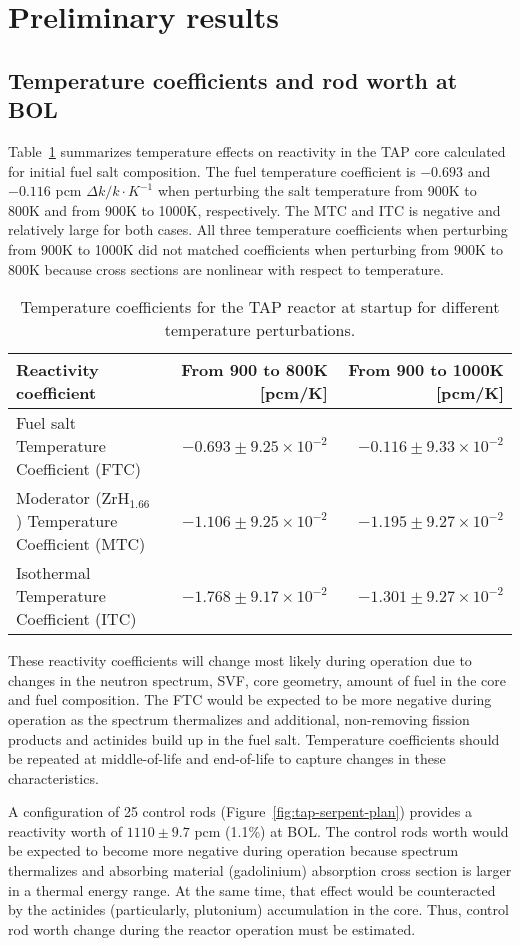 \section{Preliminary results}

\subsection{Temperature coefficients and rod worth at BOL}
Table~\ref{tab:tcoef} summarizes temperature effects on reactivity in the 
\gls{TAP} core calculated for initial fuel salt composition. The fuel 
temperature coefficient is $-0.693$ and $-0.116$ pcm $\Delta k/k\cdot K^{-1}$ 
when perturbing the salt temperature from 900K to 800K and from 900K to 1000K, 
respectively. The MTC and ITC is negative and relatively large for both 
cases. All three temperature coefficients when perturbing from 900K to 
1000K did not matched coefficients when perturbing from 900K to 800K because 
cross sections are nonlinear with respect to temperature.

\begin{table}[ht!]
	\caption{Temperature coefficients for the \gls{TAP} reactor at startup for 
	different temperature perturbations.}
	\begin{tabularx}{\textwidth}{ X  r r } \hline
		Reactivity coefficient     & From 900 to 800K [pcm/K] & From 900 to 
		1000K [pcm/K]                  \tabularnewline  \hline
		Fuel salt Temperature Coefficient (FTC) &
		$-0.693\pm9.25\times10^{-2}$ & $-0.116\pm9.33\times10^{-2}$ 
		\tabularnewline \hline
		Moderator (ZrH$_{1.66}$) Temperature Coefficient (MTC) & 
		$-1.106\pm9.25\times10^{-2}$ & $-1.195\pm9.27\times10^{-2}$  
		\tabularnewline \hline
		Isothermal Temperature Coefficient (ITC)  & 
		$-1.768\pm9.17\times10^{-2}$ &  $-1.301\pm9.27\times10^{-2}$  
		\tabularnewline \hline
	\end{tabularx}
	\label{tab:tcoef}
\end{table}
These reactivity coefficients will change most likely during operation due to 
changes in the neutron spectrum, \gls{SVF}, core geometry, amount of fuel in 
the core and fuel composition. The FTC would be expected to be more negative 
during operation as the spectrum thermalizes and additional, non-removing 
fission products and actinides build up in the fuel salt. Temperature 
coefficients should be repeated at middle-of-life and end-of-life to capture 
changes in these characteristics.

A configuration of 25 control rods (Figure~\ref{fig:tap-serpent-plan}) 
provides a reactivity worth of $1110\pm9.7$ pcm (1.1\%) at \gls{BOL}. The 
control rods worth would be expected to become more negative during operation 
because spectrum thermalizes and absorbing material (gadolinium) absorption 
cross section is larger in a thermal energy range. At the same time, that 
effect would be counteracted by the actinides (particularly, plutonium) 
accumulation in the core. Thus, control rod worth change during the reactor 
operation must be estimated.
